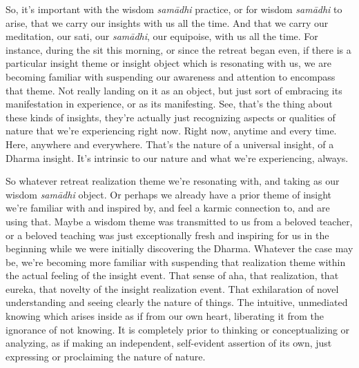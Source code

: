 \documentclass[12pt,openany]{book}
\begin{document}
So, it's important with the wisdom \textit{samādhi} practice, or for wisdom \textit{samādhi} to arise, that we carry our insights with us all the time. And that we carry our meditation, our sati, our \textit{samādhi}, our equipoise, with us all the time. For instance, during the sit this morning, or since the retreat began even, if there is a particular insight theme or insight object which is resonating with us, we are becoming familiar with suspending our awareness and attention to encompass that theme. Not really landing on it as an object, but just sort of embracing its manifestation in experience, or as its manifesting. See, that’s the thing about these kinds of insights, they're actually just recognizing aspects or qualities of nature that we're experiencing right now. Right now, anytime and every time. Here, anywhere and everywhere. That's the nature of a universal insight, of a Dharma insight. It's intrinsic to our nature and what we're experiencing, always.

So whatever retreat realization theme we're resonating with,  and taking as our wisdom \textit{samādhi} object. Or perhaps we already have a prior theme of insight we're familiar with and inspired by, and feel a karmic connection to, and are using that. Maybe a wisdom theme was transmitted to us from a beloved teacher, or a beloved teaching was just exceptionally fresh and inspiring for us in the beginning \linebreak while we were initially discovering the Dharma. Whatever the case may be, we're becoming more familiar with suspending that realization theme within the actual feeling of the insight event. That sense of aha, that realization, that eureka, that novelty of the insight realization event. That exhilaration of novel understanding and seeing clearly the nature of things. The intuitive, unmediated knowing \linebreak which arises inside as if from our own heart, liberating it from the ignorance of not knowing. It is completely prior to thinking or conceptualizing or analyzing, as if making an independent, self-evident assertion of its own, just expressing or proclaiming the nature of nature.
\end{document}
